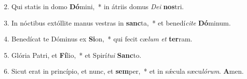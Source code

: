 2. Qui statis in domo \textbf{Dó}mini,~*  in átriis domus \textit{De}\textit{i} \textbf{nos}tri.\

3. In nóctibus extóllite manus vestras in \textbf{sanc}ta,~*  et benedí\textit{ci}\textit{te} \textbf{Dó}minum.\

4. Benedícat te Dóminus ex \textbf{Si}on,~*  qui fecit cæ\textit{lum} \textit{et} \textbf{ter}ram.\

5. Glória Patri, et \textbf{Fí}lio,~*  et Spirí\textit{tu}\textit{i} \textbf{Sanc}to.\

6. Sicut erat in princípio, et nunc, et \textbf{sem}per,~*  et in sǽcula sæcu\textit{ló}\textit{rum}. \textbf{A}men.\

